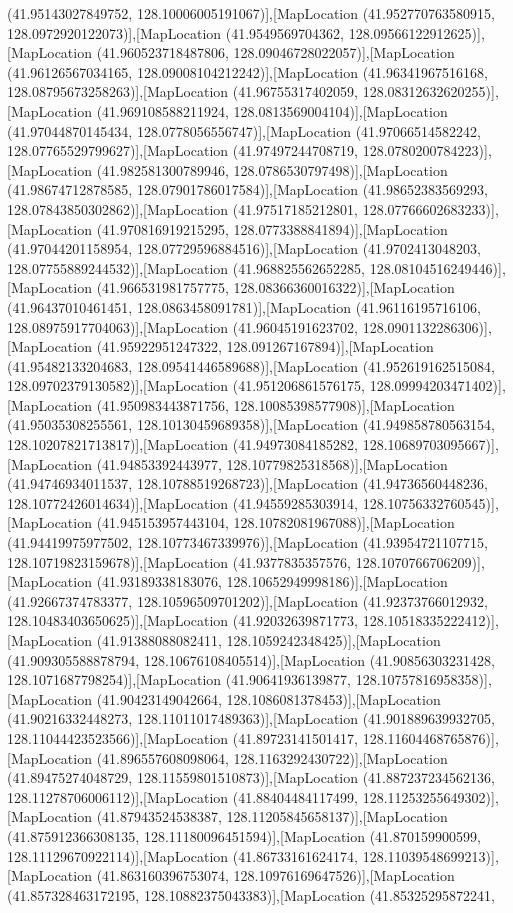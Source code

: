 (41.95143027849752, 128.10006005191067)],[MapLocation (41.952770763580915, 128.0972920122073)],[MapLocation (41.9549569704362, 128.09566122912625)],[MapLocation (41.960523718487806, 128.09046728022057)],[MapLocation (41.96126567034165, 128.09008104212242)],[MapLocation (41.96341967516168, 128.08795673258263)],[MapLocation (41.96755317402059, 128.08312632620255)],[MapLocation (41.969108588211924, 128.0813569004104)],[MapLocation (41.97044870145434, 128.0778056556747)],[MapLocation (41.97066514582242, 128.07765529799627)],[MapLocation (41.97497244708719, 128.0780200784223)],[MapLocation (41.982581300789946, 128.0786530797498)],[MapLocation (41.98674712878585, 128.07901786017584)],[MapLocation (41.98652383569293, 128.07843850302862)],[MapLocation (41.97517185212801, 128.07766602683233)],[MapLocation (41.970816919215295, 128.0773388841894)],[MapLocation (41.97044201158954, 128.07729596884516)],[MapLocation (41.9702413048203, 128.07755889244532)],[MapLocation (41.968825562652285, 128.08104516249446)],[MapLocation (41.966531981757775, 128.08366360016322)],[MapLocation (41.96437010461451, 128.0863458091781)],[MapLocation (41.96116195716106, 128.08975917704063)],[MapLocation (41.96045191623702, 128.0901132286306)],[MapLocation (41.95922951247322, 128.091267167894)],[MapLocation (41.95482133204683, 128.09541446589688)],[MapLocation (41.952619162515084, 128.09702379130582)],[MapLocation (41.951206861576175, 128.09994203471402)],[MapLocation (41.950983443871756, 128.10085398577908)],[MapLocation (41.95035308255561, 128.10130459689358)],[MapLocation (41.949858780563154, 128.10207821713817)],[MapLocation (41.94973084185282, 128.10689703095667)],[MapLocation (41.94853392443977, 128.10779825318568)],[MapLocation (41.94746934011537, 128.10788519268723)],[MapLocation (41.94736560448236, 128.10772426014634)],[MapLocation (41.94559285303914, 128.10756332760545)],[MapLocation (41.945153957443104, 128.10782081967088)],[MapLocation (41.94419975977502, 128.10773467339976)],[MapLocation (41.93954721107715, 128.10719823159678)],[MapLocation (41.9377835357576, 128.1070766706209)],[MapLocation (41.93189338183076, 128.10652949998186)],[MapLocation (41.92667374783377, 128.10596509701202)],[MapLocation (41.92373766012932, 128.10483403650625)],[MapLocation (41.92032639871773, 128.10518335222412)],[MapLocation (41.91388088082411, 128.1059242348425)],[MapLocation (41.909305588878794, 128.10676108405514)],[MapLocation (41.90856303231428, 128.1071687798254)],[MapLocation (41.90641936139877, 128.10757816958358)],[MapLocation (41.90423149042664, 128.1086081378453)],[MapLocation (41.90216332448273, 128.11011017489363)],[MapLocation (41.901889639932705, 128.11044423523566)],[MapLocation (41.89723141501417, 128.11604468765876)],[MapLocation (41.896557608098064, 128.1163292430722)],[MapLocation (41.89475274048729, 128.11559801510873)],[MapLocation (41.887237234562136, 128.11278706006112)],[MapLocation (41.88404484117499, 128.11253255649302)],[MapLocation (41.87943524538387, 128.11205845658137)],[MapLocation (41.875912366308135, 128.11180096451594)],[MapLocation (41.870159900599, 128.11129670922114)],[MapLocation (41.86733161624174, 128.11039548699213)],[MapLocation (41.863160396753074, 128.10976169647526)],[MapLocation (41.857328463172195, 128.10882375043383)],[MapLocation (41.85325295872241, 
